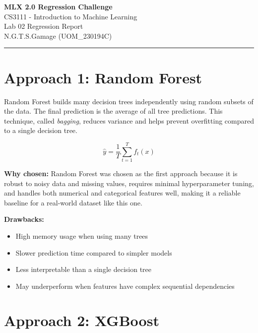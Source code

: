 \documentclass[12pt, a4paper]{article}
\begin{document}
\begin{center}
    {\LARGE \textbf{MLX 2.0 Regression Challenge}}\\[0.3cm]
    {\large CS3111 - Introduction to Machine Learning}\\[0.2cm]
    {\large Lab 02 Regression Report}\\[0.2cm]
    N.G.T.S.Gamage (UOM\_230194C) 
\end{center}

\hrule
\vspace{0.5cm}

\section*{Approach 1: Random Forest}

Random Forest builds many decision trees independently using random subsets of the data. The final prediction is the average of all tree predictions. This technique, called \textit{bagging}, reduces variance and helps prevent overfitting compared to a single decision tree.

\begin{equation}
    \hat{y} = \frac{1}{T} \sum_{t=1}^{T} f_t(x)
\end{equation}

\textbf{Why chosen:} Random Forest was chosen as the first approach because it is robust to noisy data and missing values, requires minimal hyperparameter tuning, and handles both numerical and categorical features well, making it a reliable baseline for a real-world dataset like this one.


\textbf{Drawbacks:} 
\begin{itemize}
    \item High memory usage when using many trees
    \item Slower prediction time compared to simpler models
    \item Less interpretable than a single decision tree
    \item May underperform when features have complex sequential dependencies
\end{itemize}

\section*{Approach 2: XGBoost}
\end{document}

